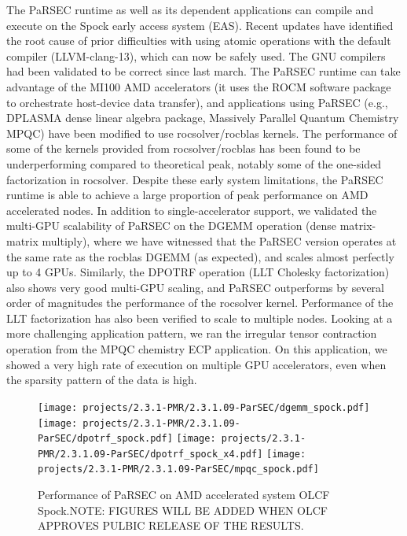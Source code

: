 The PaRSEC runtime as well as its dependent applications can compile and 
execute on the Spock early access system (EAS). Recent updates have identified
the root cause of prior difficulties with using atomic operations with the 
default compiler (LLVM-clang-13), which can now be safely used. The GNU compilers had been validated to be correct since last march.
%
The PaRSEC runtime can take advantage of the MI100 AMD accelerators (it uses the ROCM
software package to orchestrate host-device data transfer), and applications
using PaRSEC (e.g., DPLASMA dense linear algebra package, Massively Parallel Quantum Chemistry MPQC) have been modified to use rocsolver/rocblas
kernels. The performance of some of the kernels provided from rocsolver/rocblas 
has been found to be underperforming compared to theoretical peak, notably some
of the one-sided factorization in rocsolver. Despite these early system limitations, the PaRSEC
runtime is able to achieve a large proportion of peak performance on AMD
accelerated nodes. In addition to single-accelerator support, we validated the
multi-GPU scalability of PaRSEC on the DGEMM operation (dense matrix-matrix multiply),
where we have witnessed that the PaRSEC
version operates at the same rate as the rocblas DGEMM (as expected), and 
scales almost perfectly up to 4 GPUs. Similarly, the DPOTRF operation (LLT Cholesky factorization)
also shows very good multi-GPU scaling, and PaRSEC outperforms by
several order of magnitudes the performance of the rocsolver kernel. Performance of
the LLT factorization has also been verified to scale to multiple nodes. Looking at a
more challenging application pattern, we ran the irregular tensor contraction operation
from the MPQC chemistry ECP application. On this application, we showed a
very high rate of execution on multiple GPU accelerators, even when the sparsity
pattern of the data is high.

\begin{figure}
\centering
\texttt{[image: projects/2.3.1-PMR/2.3.1.09-ParSEC/dgemm\_spock.pdf]}
\texttt{[image: projects/2.3.1-PMR/2.3.1.09-ParSEC/dpotrf\_spock.pdf]}
\texttt{[image: projects/2.3.1-PMR/2.3.1.09-ParSEC/dpotrf\_spock\_x4.pdf]}
\texttt{[image: projects/2.3.1-PMR/2.3.1.09-ParSEC/mpqc\_spock.pdf]}
\caption{Performance of PaRSEC on AMD accelerated system OLCF Spock.NOTE: FIGURES WILL BE ADDED WHEN OLCF APPROVES PULBIC RELEASE OF THE RESULTS.\label{fig:parsec:spock}}
\end{figure}

